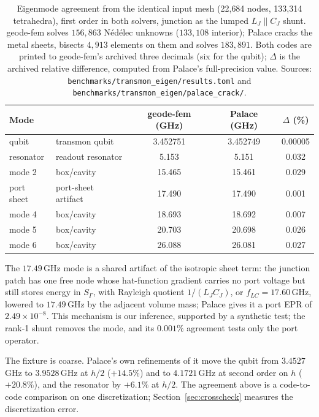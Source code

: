 \documentclass{anvil-paper}
\begin{document}
\begin{table}[htbp]
  \centering
  \caption{Eigenmode agreement from the identical input mesh (22{,}684
  nodes, 133{,}314 tetrahedra), first order in both solvers, junction as
  the lumped $L_J \parallel C_J$ shunt. geode-fem solves $156{,}863$
  N\'ed\'elec unknowns ($133{,}108$ interior); Palace cracks the metal
  sheets, bisects $4{,}913$ elements on them and solves $183{,}891$. Both
  codes are printed to geode-fem's archived three decimals (six for the
  qubit); $\Delta$ is the archived relative difference, computed from
  Palace's full-precision value. Sources:
  \texttt{benchmarks/transmon\_eigen/results.toml} and
  \texttt{benchmarks/transmon\_eigen/palace\_crack/}.}
  \label{tab:agreement}
  \footnotesize
  \begin{tabular}{@{}llccc@{}}
    \toprule
    Mode & & geode-fem (GHz) & Palace (GHz) & $\Delta$ (\%) \\
    \midrule
    qubit & transmon qubit & 3.452751 & 3.452749 & 0.00005 \\
    resonator & readout resonator & 5.153 & 5.151 & 0.032 \\
    mode 2 & box/cavity & 15.465 & 15.461 & 0.029 \\
    port sheet & port-sheet artifact & 17.490 & 17.490 & 0.001 \\
    mode 4 & box/cavity & 18.693 & 18.692 & 0.007 \\
    mode 5 & box/cavity & 20.703 & 20.698 & 0.026 \\
    mode 6 & box/cavity & 26.088 & 26.081 & 0.027 \\
    \bottomrule
  \end{tabular}
\end{table}

The $17.49$\,GHz mode is a shared artifact of the isotropic sheet term:
the junction patch has one free node whose hat-function gradient carries no
port voltage but still stores energy in $S_\Gamma$, with Rayleigh quotient
$1/(L_JC_J)$, or $f_{LC} = 17.60$\,GHz, lowered to $17.49$\,GHz by the
adjacent volume mass; Palace gives it a port EPR of $2.49\times10^{-8}$.
This mechanism is our inference, supported by a synthetic test; the rank-1
shunt removes the mode, and its $0.001\%$ agreement tests only the port
operator.

The fixture is coarse. Palace's own refinements of it move the qubit from
$3.4527$\,GHz to $3.9528$\,GHz at $h/2$ ($+14.5\%$) and to $4.1721$\,GHz
at second order on $h$ ($+20.8\%$), and the resonator by $+6.1\%$ at
$h/2$. The agreement above is a code-to-code comparison on one discretization;
Section~\ref{sec:crosscheck} measures the discretization error.
\end{document}

